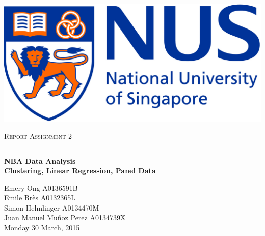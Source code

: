 
\begin{center}
	\begin{flushleft}
		\includegraphics[scale=0.1]{images/NUS.jpg}
		
	\end{flushleft}
	
	
	\vskip 5cm
	{\LARGE\textsc{Report Assignment 2}}\\
	\noindent\rule{4cm}{0.2pt}
	\vskip 0.5cm
	{\LARGE\textbf{NBA Data Analysis}}\\
	{\large\textbf{Clustering, Linear Regression, Panel Data}}\\
	\vskip 4.5cm
	
	\LARGE{Emery Ong A0136591B}\\
	\LARGE{Emile Br\`es A0132365L}\\
	\LARGE{Simon Helmlinger A0134470M}\\
	\LARGE{Juan Manuel Mu\~noz Perez A0134739X}\\
	
	\vspace{1.0cm}
	\Large{Monday 30 March, 2015}
	
	\vspace{2.cm}
	
\end{center}
